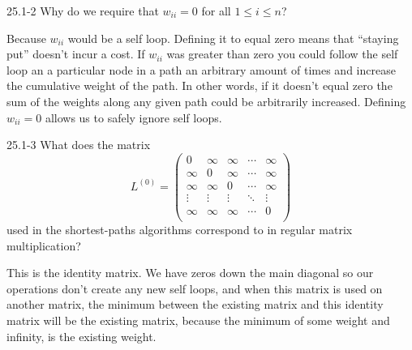 




\homeworkheader{\classnameandsection}

\begin{problem}{25.1-2}
  Why do we require that $w_{ii} = 0$ for all $1 \le i \le n$?
  \begin{solution}
    Because $w_{ii}$ would be a self loop. Defining it to equal zero means that ``staying put'' doesn't incur a cost. If
    $w_{ii}$ was greater than zero you could follow the self loop an a particular node in a path an arbitrary amount of
    times and increase the cumulative weight of the path.  In other words, if it doesn't equal zero the sum of the
    weights along any given path could be arbitrarily increased. Defining $w_{ii} = 0$ allows us to safely ignore self
    loops.
  \end{solution}
\end{problem}

\begin{problem}{25.1-3}
  What does the matrix
  \[
   L^{(0)} =
   \begin{pmatrix}
    0 & \infty & \infty & \cdots & \infty\\
    \infty & 0 & \infty & \cdots & \infty\\
    \infty & \infty & 0 & \cdots & \infty\\
    \vdots & \vdots & \vdots & \ddots & \vdots \\
    \infty & \infty & \infty & \cdots & 0 \\
   \end{pmatrix}
  \]
  used in the shortest-paths algorithms correspond to in regular matrix multiplication?
  \begin{solution}
    This is the identity matrix. We have zeros down the main diagonal so our operations don't create any new self loops,
    and when this matrix is used on another matrix, the minimum between the existing matrix and this identity matrix
    will be the existing matrix, because the minimum of some weight and infinity, is the existing weight.
  \end{solution}
\end{problem}

